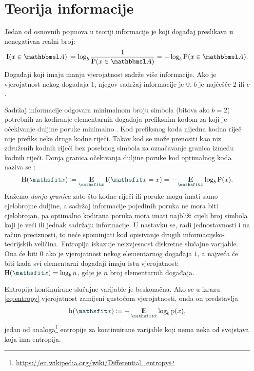 \documentclass[utf8, diplomski, lmodern]{fer}
\begin{document}
\section{Teorija informacije} \label{sec:teorija-informacije}

Jedan od osnovnih pojmova u teoriji informacije \citep{Shannon:1948:MTC} je  koji događaj preslikava u nenegativan realni broj:
\begin{align}
\I(x\in\set A)\coloneqq\log_b \frac{1}{\P(x\in\set A)} = -\log_b \P(x\in\set A) \text{.}
\end{align}
Događaji koji imaju manju vjerojatnost sadrže više informacije. Ako je vjerojatnost nekog događaja $1$, njegov sadržaj informacije je $0$. $b$ je najčešće $2$ ili $e$.

Sadržaj informacije odgovara minimalnom broju simbola (bitova ako $b=2$) potrebnih za kodiranje elementarnih događaja prefiksnim kodom za koji je očekivanje duljine poruke minimalno \citep{Olah:2015:VIT}. Kod prefiksnog koda nijedna kodna riječ nije prefiks neke druge kodne riječi. Takav kod se može prenositi kao niz združenih kodnih riječi bez posebnog simbola za označavanje granica između kodnih riječi. Donja granica očekivanja duljine poruke kod optimalnog koda naziva se :
\begin{align}\label{eq:entropy}
\H(\rvar x) \coloneqq  \E_{\rvar x}\I(\rvar x=x) = -\E_{\rvar x}\log_b \P(x) \text{.}
\end{align}
Kažemo \textit{donja granica} zato što kodne riječi ili poruke mogu imati samo cjelobrojne duljine, a sadržaj informacije pojedinih poruka ne mora biti cjelobrojan, pa optimalno kodirana poruka mora imati najbliži cijeli broj simbola koji je veći ili jednak sadržaju informacije. U nastavku se, radi jednostavnosti i na račun preciznosti, to neće spominjati kod opisivanje drugih informacijsko-teorijskih veličina. Entropija iskazuje neizvjesnost diskretne slučajne varijable. Ona će biti $0$ ako je vjerojatnost nekog elementarnog događaja $1$, a najveća će biti kada svi elementarni događaji imaju istu vjerojatnost: $\H(\rvar x)=\log_b n$, gdje je $n$ broj elementarnih događaja. 

Entropija kontinuirane slučajne varijable je beskonačna. Ako se u izrazu \eqref{eq:entropy} vjerojatnost zamijeni gustoćom vjerojatnosti, onda on predstavlja 
\begin{align}\label{eq:diff-entropy}
\h(\rvar x) \coloneqq -\E_{\rvar x}\log_b \p(x) \text{,}
\end{align}
jedan od analoga\footnote{\url{https://en.wikipedia.org/wiki/Differential_entropy}} entropije za kontinuirane varijable koji nema neka od svojstava koja ima entropija.
\end{document}
